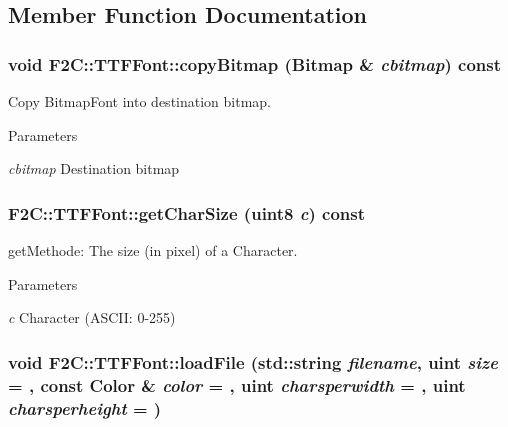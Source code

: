 \subsection{Member Function Documentation}
\hypertarget{class_f2_c_1_1_t_t_f_font_afbbfad00d11e781919bd9b88595220c1}{
\subsubsection[{copyBitmap}]{\setlength{\rightskip}{0pt plus 5cm}void F2C::TTFFont::copyBitmap ({\bf Bitmap} \& {\em cbitmap}) const}}
\label{class_f2_c_1_1_t_t_f_font_afbbfad00d11e781919bd9b88595220c1}


Copy BitmapFont into destination bitmap. 
\begin{DoxyParams}{Parameters}
\item[{\em cbitmap}]Destination bitmap \end{DoxyParams}
\hypertarget{class_f2_c_1_1_t_t_f_font_ae9122df089408bb62dc4cdc99241afc1}{
\subsubsection[{getCharSize}]{ F2C::TTFFont::getCharSize ({\bf uint8} {\em c}) const}}
\label{class_f2_c_1_1_t_t_f_font_ae9122df089408bb62dc4cdc99241afc1}


getMethode: The size (in pixel) of a Character. 
\begin{DoxyParams}{Parameters}
\item[{\em c}]Character (ASCII: 0-\/255) \end{DoxyParams}
\hypertarget{class_f2_c_1_1_t_t_f_font_a3f2ea2a2f2d446a0cf9ac58e9e70ae49}{
\subsubsection[{loadFile}]{\setlength{\rightskip}{0pt plus 5cm}void F2C::TTFFont::loadFile (std::string {\em filename}, \/  {\bf uint} {\em size} = {}, \/  const {\bf Color} \& {\em color} = {}, \/  {\bf uint} {\em charsperwidth} = {}, \/  {\bf uint} {\em charsperheight} = {})}}
\label{class_f2_c_1_1_t_t_f_font_a3f2ea2a2f2d446a0cf9ac58e9e70ae49}


